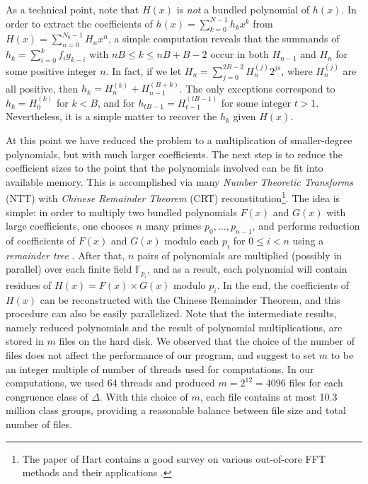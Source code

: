 \documentclass{mcom-l}
\theoremstyle{definition}
\begin{document}
As a technical point, note that $H(x)$ is \emph{not} a bundled
polynomial of $h(x)$.  In order to extract the coefficients of $h(x) =
\sum_{k = 0}^{N-1}h_kx^k$ from $H(x) = \sum_{n = 0}^{N_0 - 1}H_nx^n$,
a simple computation reveals that the summands of $h_k = \sum_{i =
  0}^k f_ig_{k-i}$ with $nB \leq k \leq nB + B - 2$ occur in both
$H_{n-1}$ and $H_n$ for some positive integer $n$. In fact, if we let
$H_n = \sum_{j = 0}^{2B-2}H_n^{(j)}2^{js}$, where $H_n^{(j)}$ are all
positive, then $h_k = H_{n}^{(k)} + H_{n-1}^{(B + k)}$. The only
exceptions correspond to $h_k = H_0^{(k)}$ for $k < B$, and for
$h_{tB-1} = H_{t-1}^{(tB-1)}$ for some integer $t > 1$.  Nevertheless,
it is a simple matter to recover the $h_k$ given $H(x).$

At this point we have reduced the problem to a multiplication of
smaller-degree polynomials, but with much larger coefficients.  The
next step is to reduce the coefficient sizes to the point that the
polynomials involved can be fit into available memory.  This is
accomplished via many \emph{Number Theoretic Transforms} (NTT) with
\emph{Chinese Remainder Theorem} (CRT) reconstitution\footnote{The
  paper of Hart contains a good survey on various out-of-core FFT
  methods and their applications \cite[Section 3]{hart}.}. The idea is
simple: in order to multiply two bundled polynomials $F(x)$ and $G(x)$
with large coefficients, one chooses $n$ many primes $p_0, \ldots,
p_{n-1}$, and performs reduction of coefficients of $F(x)$ and $G(x)$
modulo each $p_i$ for $0 \leq i < n$ using a \emph{remainder tree}
\cite{borodin}.  After that, $n$ pairs of polynomials are multiplied
(possibly in parallel) over each finite field $\mathbb F_{p_i}$, and
as a result, each polynomial will contain residues of $H(x) = F(x)
\times G(x)$ modulo $p_i$. In the end, the coefficients of $H(x)$ can
be reconstructed with the Chinese Remainder Theorem, and this
procedure can also be easily parallelized. Note that the intermediate
results, namely reduced polynomials and the result of polynomial
multiplications, are stored in $m$ files on the hard disk. We observed
that the choice of the number of files does not affect the performance
of our program, and suggest to set $m$ to be an integer multiple of
number of threads used for computations. In our computations, we used
64 threads and produced $m = 2^{12} = 4096$ files for each congruence
class of $\Delta.$  With this choice of $m$, each file contains at
most 10.3 million class groups, providing a reasonable balance
between file size and total number of files.
\end{document}
